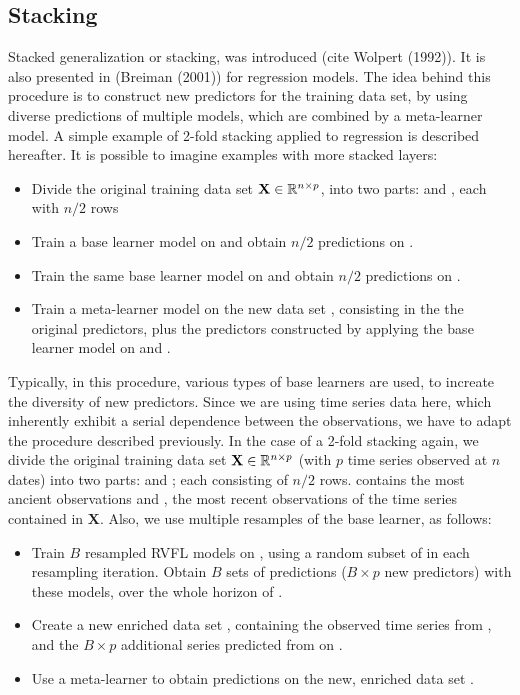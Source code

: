 \subsection{Stacking}
\label{section:rvflstacking}

Stacked generalization or stacking, was introduced (cite Wolpert (1992)). It is also presented in (Breiman (2001)) for regression models. The idea behind this procedure is to construct new predictors for the training data set, by using diverse predictions of multiple models, which are combined by a meta-learner model. A simple example of 2-fold stacking applied to regression is described hereafter. It is possible to imagine examples with more stacked layers:

\begin{itemize}
\item Divide the original training data set $\textbf{X} \in \mathbb{R}^{n \times p}$, into two parts:  and , each with $n/2$ rows
\item Train a base learner model on  and obtain $n/2$ predictions on .
\item Train the same base learner model on  and obtain $n/2$ predictions on .
\item Train a  meta-learner model on the new data set , consisting in the the original predictors, plus the predictors constructed by applying the base learner model on  and .
\end{itemize}

\medskip

Typically, in this procedure, various types of base learners are used, to increate the diversity of new predictors. Since we are using time series data here, which inherently exhibit a serial dependence between the observations, we have to adapt the procedure described previously. In the case of a 2-fold stacking again, we divide the original training data set  $\textbf{X} \in \mathbb{R}^{n \times p}$ (with $p$ time series observed at $n$ dates) into two parts:  and ; each consisting of $n/2$ rows.  contains the most ancient observations and , the most recent observations of the time series contained in $\textbf{X}$. Also, we use multiple resamples of the base learner, as follows:

\begin{itemize}
\item Train $B$ resampled RVFL models on , using a random subset of  in each resampling iteration. Obtain $B$ sets of predictions ($B \times p$ new predictors) with these models, over the whole horizon  of .
\item Create a new enriched data set , containing the observed time series from , and the $B \times p$ additional series predicted from  on .
\item Use a meta-learner to obtain predictions on the new, enriched data set .
\end{itemize}

